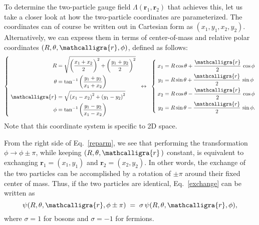 \documentclass[pra,12pt]{revtex4}
\begin{document}
To determine the two-particle gauge field
$\Lambda(\mathbf{r}_1,\mathbf{r}_2)$ that achieves this, let us take a
closer look at how the two-particle coordinates are parameterized.
The coordinates can of course be written out in Cartesian form as
$(x_1, y_1, x_2, y_2)$.  Alternatively, we can express them in terms
of center-of-mass and relative polar coordinates $(R, \theta,
\mathcalligra{r}, \phi)$, defined as follows:
\begin{align}
  \left\{\;
  \begin{aligned}
  R &= \sqrt{\left(\frac{x_1+x_2}{2}\right)^2 + \left(\frac{y_1+y_2}{2}\right)^2} \\
  \theta &= \tan^{-1}\left(\frac{y_1+y_2}{x_1+x_2}\right) \\
  \mathcalligra{r} &= \sqrt{\left(x_1-x_2\right)^2 + \left(y_1-y_2\right)^2} \\
  \phi &= \tan^{-1}\left(\frac{y_1-y_2}{x_1-x_2}\right)
  \end{aligned}
  \right.
  \;\;\leftrightarrow\;\;
  \left\{ \;
  \begin{aligned}
    x_1 &= R \cos\theta + \frac{\mathcalligra{r}}{2} \,\cos\phi \\
    y_1 &= R \sin\theta + \frac{\mathcalligra{r}}{2} \,\sin\phi \\
    x_2 &= R \cos\theta - \frac{\mathcalligra{r}}{2} \,\cos\phi \\
    y_2 &= R \sin\theta - \frac{\mathcalligra{r}}{2} \,\sin\phi.
  \end{aligned}
  \right.
  \label{reparm}
\end{align}
Note that this coordinate system is specific to 2D space.

From the right side of Eq.~\eqref{reparm}, we see that performing the
transformation $\phi \rightarrow \phi \pm \pi$, while keeping $(R,
\theta, \mathcalligra{r}\,)$ constant, is equivalent to exchanging
$\mathbf{r}_1 = (x_1,y_1)$ and $\mathbf{r}_2 =(x_2,y_2)$.  In other
words, the exchange of the two particles can be accomplished by a
rotation of $\pm \pi$ around their fixed center of mass.  Thus, if the
two particles are identical, Eq.~\eqref{exchange} can be written as
\begin{equation}
  \psi(R, \theta, \mathcalligra{r}, \phi \pm \pi) \;=\;
  \sigma \, \psi(R, \theta, \mathcalligra{r}, \phi),
\end{equation}
where $\sigma = 1$ for bosons and $\sigma = -1$ for fermions.
\end{document}
